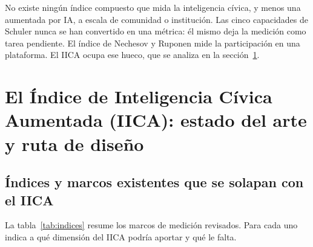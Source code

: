 \documentclass[11pt,a4paper]{article}
\begin{document}
\begin{original}
No existe ningún índice compuesto que mida la inteligencia cívica, y menos una aumentada por IA, a escala de comunidad o institución. Las cinco capacidades de Schuler nunca se han convertido en una métrica: él mismo deja la medición como tarea pendiente. El índice de Nechesov y Ruponen mide la participación en una plataforma. El IICA ocupa ese hueco, que se analiza en la sección~\ref{sec:iica}.
\end{original}

\section{El Índice de Inteligencia Cívica Aumentada (IICA): estado del arte y ruta de diseño}\label{sec:iica}

\subsection{Índices y marcos existentes que se solapan con el IICA}

La tabla~\ref{tab:indices} resume los marcos de medición revisados. Para cada uno indica a qué dimensión del IICA podría aportar y qué le falta.
\end{document}
